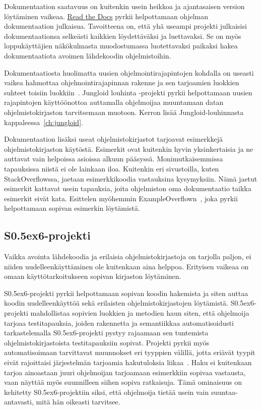\documentclass[finnish]{tktltiki2}
\theoremstyle{definition}
\theoremstyle{remark}
\begin{document}
Dokumentaation saatavuus on kuitenkin usein heikkoa ja ajantasaisen version löytäminen vaikeaa. \href{https://readthedocs.org/}{Read the Docs} pyrkii helpottamaan ohjelman dokumentaation julkaisua. Tavoitteena on, että yhä useampi projekti julkaisisi dokumentaationsa selkeästi kaikkien löydettäväksi ja luettavaksi. Se on myös loppukäyttäjien näkökulmasta muodostumassa luotettavaksi paikaksi hakea dokumentaatiota avoimen lähdekoodin ohjelmistoihin.

Dokumentaatiosta huolimatta uusien ohjelmointirajapintojen kohdalla on useasti vaikea hahmottaa ohjelmointirajapinnan rakenne ja sen tarjoamien luokkien suhteet toisiin luokkiin~\cite{jungloid-mining}. Jungloid louhinta -projekti pyrkii helpottamaan uusien rajapintojen käyttöönottoa auttamalla ohjelmoijaa muuntamaan datan ohjelmistokirjaston tarvitsemaan muotoon. Kerron lisää Jungloid-louhinnasta kappaleessa~\ref{ch:jungloid}.

Dokumentaation lisäksi useat ohjelmistokirjastot tarjoavat esimerkkejä ohjelmistokirjaston käytöstä. Esimerkit ovat kuitenkin hyvin yksinkertaisia ja ne auttavat vain helpoissa asioissa alkuun pääsyssä. Monimutkaisemmissa tapauksissa niistä ei ole lainkaan iloa. Kuitenkin eri sivustoilla, kuten StackOverflowssa, jaetaan esimerkkikoodia vastauksina kysymyksiin. Nämä jaetut esimerkit kattavat usein tapauksia, joita ohjelmiston oma dokumentaatio taikka esimerkit eivät kata. Esittelen myöhemmin ExampleOverflown~\cite{example-overflow-social-media-for-code-recommendations}, joka pyrkii helpottamaan sopivan esimerkin löytämistä.

\subsection{S\raise0.5ex\hbox{6}-projekti}
Vaikka avointa lähdekoodia ja erilaisia ohjelmistokirjastoja on tarjolla paljon, ei niiden uudelleenkäyttäminen ole kuitenkaan aina helppoa. Erityisen vaikeaa on omaan käyttötarkoitukseen sopivan kirjaston löytäminen.

S\raise0.5ex\hbox{6}-projekti pyrkii helpottamaan sopivan koodin hakemista ja siten auttaa koodin uudelleenkäyttöä sekä erilaisten ohjelmistokirjastojen löytämistä. S\raise0.5ex\hbox{6}-projekti mahdollistaa sopivien luokkien ja metodien haun siten, että ohjelmoija tarjoaa testitapauksia, joiden rakennetta ja semantiikkaa automatisoidusti tarkastelemalla S\raise0.5ex\hbox{6}-projekti pystyy rajaamaan sen tuntemista ohjelmistokirjastoista testitapauksiin sopivat. Projekti pyrkii myös automatisoimaan tarvittavat muunnokset eri tyyppien välillä, jotta eriävät tyypit eivät rajoittaisi järjestelmän tarjoamia hakutuloksia liikaa~\cite{what-to-search-for}. Haku ei kuitenkaan tarjoa ainoastaan juuri ohjelmoijan tarjoamaan esimerkkiin sopivaa vastausta, vaan näyttää myös suunnilleen siihen sopiva ratkaisuja. Tämä ominaisuus on kehitetty S\raise0.5ex\hbox{6}-projektiin siksi, että ohjelmoija tietää usein vain suuntaa-antavasti, mitä hän oikeasti tarvitsee.
\end{document}
